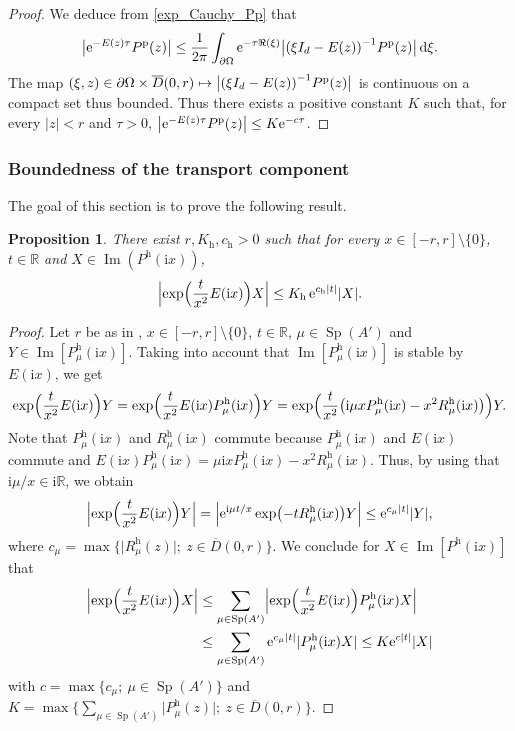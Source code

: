 \documentclass[JEP,XML,SOM,Unicode,NoEqCountersInSection]{cedram}
\def\mto{\mathchoice{\longmapsto}{\mapsto}{\mapsto}{\mapsto}}
\theoremstyle{plain}
\newtheorem{prop}[theorem]{Proposition}
\theoremstyle{definition}
\theoremstyle{remark}
\DeclareMathOperator{\Sp}{Sp}
\DeclareMathOperator{\Ima}{Im}
\newcommand{\diff}[1][-3]{\ensuremath{\mathop{}\mkern#1mu\mathrm{d}}}
\newcommand{\set}{\mathbb}
\newcommand{\R}{} %
\renewcommand{\R}{\set{R}}
\newcommand{\h}{{\mathrm h}}
\newcommand{\p}{{\mathrm p}}
\newcommand{\eu}{\mathrm e}
\newcommand{\iu}{\mathrm i}
\let\originalleft\left
\let\originalright\right
\renewcommand{\left}{\mathopen{}\mathclose\bgroup\originalleft}
\renewcommand{\right}{\aftergroup\egroup\originalright}
\begin{document}
\begin{proof}
We deduce from \eqref{exp_Cauchy_Pp} that
\[
\bigl| \eu^{-E(z)\tau} P^\p(z) \bigr|
\leq \frac{1}{2\pi }\int_{\partial\Omega} \eu^{-\tau \Re(\xi)} \bigl| \left(\xi I_d - E(z) \right)^{-1} P^\p(z) \bigr| \diff\xi.
\]
The map $(\xi,z)\in\partial\Omega \times \overline{D}(0,r) \mto \bigl| \left(\xi I_d - E(z) \right)^{-1} P^\p(z) \bigr|$ is continuous on a compact set thus bounded. Thus there exists a positive constant $K$ such that, for every $|z|<r$ and $\tau>0$,
$\left| \eu^{-E(z)\tau} P^\p(z) \right| \leq K \eu^{-c\tau}$.
\end{proof}

\subsubsection{Boundedness of the transport component}\label{subsubsec:bound}

The goal of this section is to prove the following result.

\begin{prop} \label{Prop:dissip_h}
There exist $r, K_\h, c_\h >0$ such that for every $x\in [-r,r]\setminus\{0\}$, $t\in\R$ and $X \in \Ima(P^\h(\iu x))$,
\[
\Bigl\lvert \exp\Bigl(\frac{t}{x^2} E(\iu x) \Bigr) X \Bigr\rvert \leq K_\h \,\eu^{c_\h |t|} |X|.
\]
\end{prop}

\begin{proof}
Let $r$ be as in , $x \in [-r,r]\setminus\{0\}$, $t\in\R$, $\mu \in \Sp(A')$ and $Y \in \Ima[P^\h_\mu(\iu x)]$.
Taking into account that $\Ima[P^\h_\mu(\iu x)]$ is stable by $E(\iu x)$, we get
\[
\exp \Bigl(\frac{t}{x^2} E(\iu x) \Bigr) Y
=\exp \Bigl(\frac{t}{x^2} E(\iu x) P_\mu^\h(\iu x) \Bigr) Y \\
=\exp \Bigl(\frac{t}{x^2} \bigl(\iu\mu x P_\mu^\h(\iu x)- x^2 R_\mu^\h(\iu x) \bigr) \Bigr) Y.
\]
Note that $P_\mu^\h(\iu x)$ and $R_\mu^\h(\iu x)$ commute
because $P_\mu^\h(\iu x)$ and $E(\iu x)$ commute and
$E(\iu x)P_\mu^\h(\iu x)=\mu \iu x P_\mu^\h(\iu x)-x^2 R_\mu^\h(\iu x)$. Thus, by using that $\iu \mu/ x \in \iu\R$, we obtain
\[
\Bigl\lvert \exp \Bigl(\frac{t}{x^2} E(\iu x) \Bigr) Y \Bigr\rvert =
\Bigl\lvert\eu^{\iu\mu t/x} \exp\left(-tR_\mu^\h(\iu x) \right) Y\Bigr\rvert
\leq \eu^{c_\mu |t|} | Y |,
\]
where $c_\mu=\max\{ \lvert R_\mu^\h(z)\rvert ;\: z \in \overline{D}(0,r) \}$.
We conclude for $X\in\Ima[P^\h(\iu x)]$ that
\begin{align*}
\Bigl\lvert \exp \Bigl(\frac{t}{x^2} E(\iu x) \Bigr) X \Bigr\rvert
& \leq
\sum_{\mu \in \Sp(A')} \Bigl\lvert \exp \Bigl(\frac{t}{x^2} E(\iu x) \Bigr) P^\h_\mu(\iu x) X \Bigr\rvert
\\ & \leq
\sum_{\mu \in \Sp(A')} \eu^{c_\mu |t|} \lvert P^\h_\mu(\iu x) X \rvert
\leq
K \eu^{c|t|} |X|
\end{align*}
with
$c=\max\{ c_\mu ;\: \mu \in \Sp(A') \}$ and
$K=\max\bigl\{ \sum_{\mu \in \Sp(A')} \lvert P^\h_\mu(z) \rvert;\: z \in \overline{D}(0,r) \bigr\}$.
\end{proof}
\end{document}
